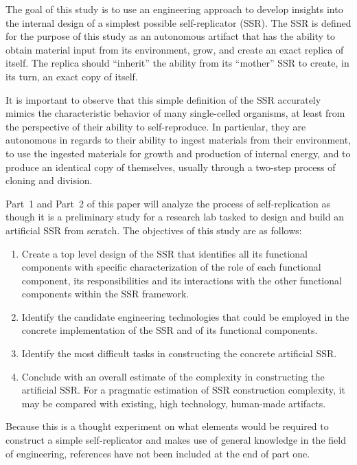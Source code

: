 The goal of this study is to use an engineering approach to develop
insights into the internal design of a simplest possible self-replicator (SSR). 
The SSR is defined for the purpose of this study as
an autonomous artifact that has the ability to obtain material input from
its environment, grow, and create an exact replica of itself. The
replica should ``inherit'' the ability from its ``mother'' SSR to create,
in its turn, an exact copy of itself.

It is important to observe that this simple definition of the SSR accurately mimics the characteristic behavior of many single-celled organisms, at least from the perspective of their ability to self-reproduce. In particular, they are autonomous in regards to their ability to ingest materials from their environment, to use the ingested materials for growth and production of internal energy, and to produce an identical copy of themselves, usually through a two-step process of cloning and division. 

Part~1 and Part~2 of this paper will analyze the process of self-replication as though it is a preliminary study for a research lab tasked to design and build an artificial SSR from scratch. The objectives of this study are as follows:

\begin{enumerate}
\item  Create a top level design of the SSR that identifies all its
functional components with specific characterization of the role of
each functional component, its responsibilities and its interactions
with the other functional components within the SSR framework.
\item  Identify the candidate engineering technologies that could be employed in
the concrete implementation of the SSR and of its functional
components.
\item  Identify the most difficult tasks in constructing the
concrete artificial SSR.
\item  Conclude with an overall estimate of the complexity 
in constructing
the artificial SSR. For a pragmatic estimation of
SSR construction complexity, it may be compared with 
existing, high technology, human-made artifacts.
\end{enumerate}

Because this is a thought experiment on what elements would be required to construct a simple self-replicator and makes use of general knowledge in the field of engineering, references have not been included at the end of part one.

